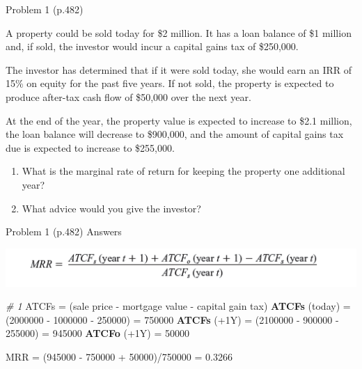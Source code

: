 \documentclass[ignorenonframetext,]{beamer}
\newenvironment{Shaded}{\begin{snugshade}}{\end{snugshade}}
\newcommand{\KeywordTok}[1]{\textcolor[rgb]{0.13,0.29,0.53}{\textbf{{#1}}}}
\newcommand{\DecValTok}[1]{\textcolor[rgb]{0.00,0.00,0.81}{{#1}}}
\newcommand{\FloatTok}[1]{\textcolor[rgb]{0.00,0.00,0.81}{{#1}}}
\newcommand{\StringTok}[1]{\textcolor[rgb]{0.31,0.60,0.02}{{#1}}}
\newcommand{\CommentTok}[1]{\textcolor[rgb]{0.56,0.35,0.01}{\textit{{#1}}}}
\newcommand{\NormalTok}[1]{{#1}}
\providecommand{\tightlist}{%
\setlength{\itemsep}{0pt}\setlength{\parskip}{0pt}}
\begin{document}
\begin{frame}{Problem 1 (p.482)}

\small

A property could be sold today for \$2 million. It has a loan balance of
\$1 million and, if sold, the investor would incur a capital gains tax
of \$250,000.

The investor has determined that if it were sold today, she would earn
an IRR of 15\% on equity for the past five years. If not sold, the
property is expected to produce after-tax cash flow of \$50,000 over the
next year.

At the end of the year, the property value is expected to increase to
\$2.1 million, the loan balance will decrease to \$900,000, and the
amount of capital gains tax due is expected to increase to \$255,000.

\begin{enumerate}
\def\labelenumi{\arabic{enumi}.}
\tightlist
\item
  What is the marginal rate of return for keeping the property one
  additional year?
\item
  What advice would you give the investor?
\end{enumerate}

\end{frame}

\begin{frame}[fragile]{Problem 1 (p.482) Answers}

\footnotesize

\begin{center}\includegraphics[width=300 px]{mrr} \end{center}

\begin{Shaded}
\begin{Highlighting}[]
\CommentTok{# 1 }
\NormalTok{ATCFs =}\StringTok{ }\NormalTok{(sale price -}\StringTok{ }\NormalTok{mortgage value -}\StringTok{ }\NormalTok{capital gain tax)}
\KeywordTok{ATCFs} \NormalTok{(today) =}\StringTok{ }\NormalTok{(}\DecValTok{2000000} \NormalTok{-}\StringTok{ }\DecValTok{1000000} \NormalTok{-}\StringTok{ }\DecValTok{250000}\NormalTok{) =}\StringTok{ }\DecValTok{750000}
\KeywordTok{ATCFs} \NormalTok{(+1Y) =}\StringTok{ }\NormalTok{(}\DecValTok{2100000} \NormalTok{-}\StringTok{ }\DecValTok{900000} \NormalTok{-}\StringTok{ }\DecValTok{255000}\NormalTok{) =}\StringTok{ }\DecValTok{945000}
\KeywordTok{ATCFo} \NormalTok{(+1Y) =}\StringTok{ }\DecValTok{50000}

\NormalTok{MRR =}\StringTok{ }
\NormalTok{(}\DecValTok{945000} \NormalTok{-}\StringTok{ }\DecValTok{750000} \NormalTok{+}\StringTok{ }\DecValTok{50000}\NormalTok{)/}\DecValTok{750000} \NormalTok{=}\StringTok{ }\FloatTok{0.3266}
\end{Highlighting}
\end{Shaded}

\end{frame}
\end{document}
